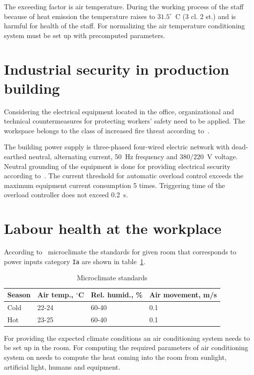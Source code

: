 The exceeding factor is air temperature. During the working process of the staff
because of heat emission the temperature raises to $31.5^\circ$~C (3 cl. 2 st.)
and is harmful for health of the staff. For normalizing the air temperature
conditioning system must be set up with precomputed parameters.

\section{Industrial security in production building}
Considering the electrical equipment located in the office, organizational and
technical countermeasures for protecting workers' safety need to be applied.
The workspace belongs to the class of increased fire threat according
to~\cite{npaop1-21}.

The building power supply is three-phased four-wired electric network with
dead-earthed neutral, alternating current, 50~Hz frequency and $380/220$~V
voltage. Neutral grounding of the equipment is done for providing electrical
security according to~\cite{gost030}. The current threshold for automatic
overload control exceeds the maximum equipment current consumption 5 times.
Triggering time of the overload controller does not exceed 0.2~s.

\section{Labour health at the workplace}

According to~\cite{dsanpin} microclimate the standards for given room that
corresponds to power inputs category \verb+Ia+ are shown in
table~\ref{tbl:aero-req}.

\begin{table}[htbp]
    \centering
    \caption{Microclimate standards}
    \label{tbl:aero-req}
    \begin{tabular}{|l|l|l|l|}
        \hline
        Season & Air temp., $^\circ$C & Rel. humid., \% & Air movement, m/s\\ \hline
       Cold & 22-24 & 60-40 & 0.1 \\ \hline
       Hot & 23-25 & 60-40 & 0.1 \\ \hline
    \end{tabular}
\end{table}

For providing the expected climate conditions an air conditioning system needs
to be set up in the room. For computing the required parameters of air
conditioning system on needs to compute the heat coming into the room from
sunlight, artificial light, humans and equipment.

